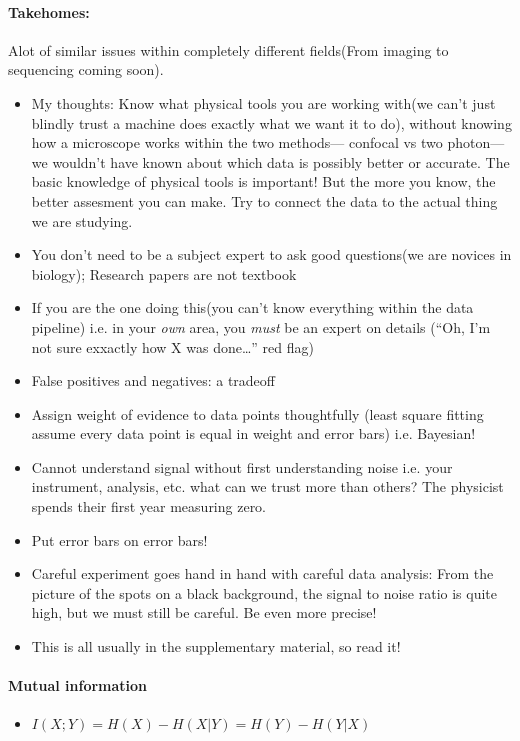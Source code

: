 \documentclass[../main.tex]{subfiles}
\begin{document}
\paragraph*{Takehomes:} Alot of similar issues within completely different fields(From imaging to 
sequencing coming soon).
\begin{itemize}
    \item My thoughts: Know what physical tools you are working with(we can't just blindly trust a machine does
    exactly what we want it to do), without knowing how a microscope works within the two methods---
    confocal vs two photon---we wouldn't have known about which data is possibly better or accurate.
    The basic knowledge of physical tools is important! But the more you know, the better
    assesment you can make. Try to connect the data to the actual thing we are studying. 
    \item You don't need to be a subject expert to ask good questions(we are novices in biology);
    Research papers are not textbook
    \item If you are the one doing this(you can't know everything within the data pipeline) i.e.
    in your \emph{own} area, you \emph{must} be an expert on details (``Oh, I'm not sure exxactly 
    how X was done\dots'' red flag) 
    \item False positives and negatives: a tradeoff
    \item Assign weight of evidence to data points thoughtfully (least square fitting assume every
    data point is equal in weight and error bars) i.e. Bayesian!
    \item Cannot understand signal without first understanding noise i.e. your instrument, analysis,
    etc. what can we trust more than others? The physicist spends their first year measuring zero.
    \item Put error bars on error bars!
    \item Careful experiment goes hand in hand with careful data analysis: From the picture of the
    spots on a black background, the signal to noise ratio is quite high, but we must still be
    careful. Be even more precise!
    \item This is all usually in the supplementary material, so read it!
\end{itemize}

\paragraph*{Mutual information}
\begin{itemize}
    \item $I(X;Y) = H(X) - H(X|Y) = H(Y) - H(Y|X)$
\end{itemize}
\end{document}
